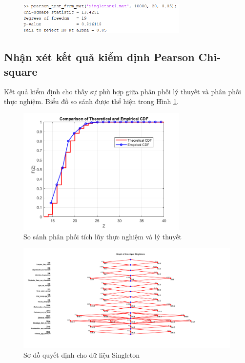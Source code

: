 \begin{figure}[h!]
    \includegraphics[width=0.75\textwidth]{../../assets/images/chay_singleton.png}
\end{figure}

\subsection*{Nhận xét kết quả kiểm định Pearson Chi-square}

Kết quả kiểm định cho thấy sự phù hợp giữa phân phối lý thuyết và phân phối thực nghiệm. Biểu đồ so sánh được thể hiện trong Hình \ref{fig:Sing_comparison}.

\begin{figure}[h!]
    \centering
    \includegraphics[width=0.75\textwidth]{../../assets/images/Singletons_Pearson.png}
    \caption{So sánh phân phối tích lũy thực nghiệm và lý thuyết}
    \label{fig:Sing_comparison}
\end{figure}

\begin{figure}[h!]
    \centering
    \includegraphics[width=0.8\linewidth]{../../assets/images/fig_Singletons.png}
    \caption{Sơ đồ quyết định cho dữ liệu Singleton}
\end{figure}

